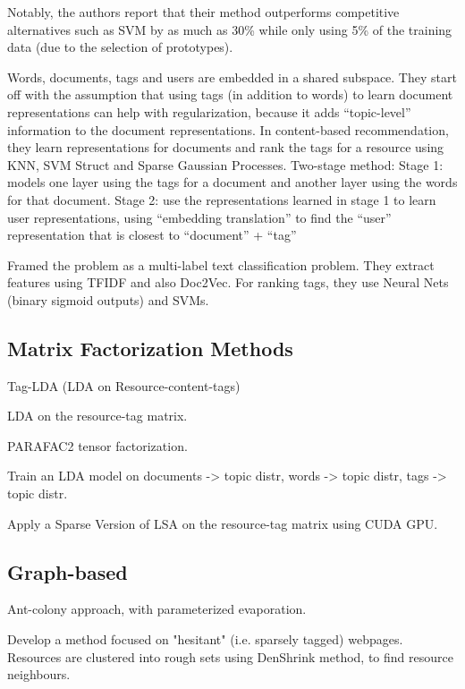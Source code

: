 Notably, the authors report that their method outperforms competitive alternatives such as SVM by as much as 30\% while only using 5\% of the training data (due to the selection of prototypes).

\cite{kataria_agarwal_2015}
Words, documents, tags and users are embedded in a shared subspace.
They start off with the assumption that using tags (in addition to words) to learn document representations can help with regularization, because it adds “topic-level” information to the document representations.
In content-based recommendation, they learn representations for documents and rank the tags for a resource using KNN, SVM Struct and Sparse Gaussian Processes.
Two-stage method:
Stage 1: models one layer using the tags for a document and another layer using the words for that document.
Stage 2: use the representations learned in stage 1 to learn user representations, using “embedding translation” to find the “user” representation that is closest to “document” + “tag”

\cite{tao_yao_2016}

Framed the problem as a multi-label text classification problem. They extract features using TFIDF and also Doc2Vec. For ranking tags, they use Neural Nets (binary sigmoid outputs) and SVMs.


\subsection{Matrix Factorization Methods}

\cite{si_sun_2008} Tag-LDA (LDA on Resource-content-tags)

\cite{bundschus_etal_2009} LDA on the resource-tag matrix.

\cite{panagakis_kotropoulos_2011} PARAFAC2 tensor factorization.

\cite{hu_etal_2012} Train an LDA model on documents -> topic distr, words -> topic distr, tags -> topic distr.

\cite{zhang_etal_2014} Apply a Sparse Version of LSA on the resource-tag matrix using CUDA GPU.


\subsection{Graph-based}

\cite{sharma_bedi_2009} Ant-colony approach, with parameterized evaporation.

\cite{wang_etal_2015} Develop a method focused on "hesitant" (i.e. sparsely tagged) webpages. Resources are clustered into rough sets using DenShrink method, to find resource neighbours.

